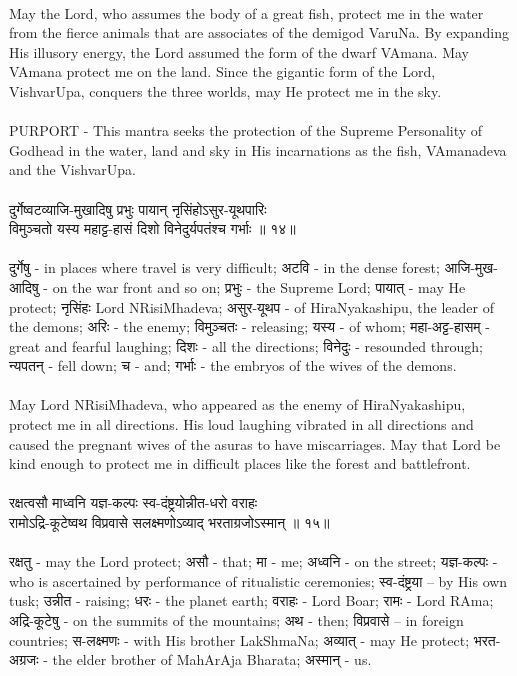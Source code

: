 \\
May the Lord, who assumes the body of a great fish, protect me in the water from the fierce animals that are associates of the demigod VaruNa. By expanding His illusory energy, the Lord assumed the form of the dwarf VAmana. May VAmana protect me on the land. Since the gigantic form of the Lord, VishvarUpa, conquers the three worlds, may He protect me in the sky.\\
\\
PURPORT - This mantra seeks the protection of the Supreme Personality of Godhead in the water, land and sky in His incarnations as the fish, VAmanadeva and the VishvarUpa.\\
\\
दुर्गेष्वटव्याजि-मुखादिषु प्रभुः पायान् नृसिंहोऽसुर-यूथपारिः\\
विमुञ्चतो यस्य महाट्ट-हासं दिशो विनेदुर्यपतंश्च गर्भाः ॥ १४॥\\
\\
दुर्गेषु - in places where travel is very difficult; अटवि - in the dense forest;  आजि-मुख-आदिषु - on the war front and so on;  प्रभुः - the Supreme Lord;  पायात् - may He protect;  नृसिंहः  Lord NRisiMhadeva;  असुर-यूथप - of HiraNyakashipu, the leader of the demons;  अरिः - the enemy; विमुञ्चतः - releasing;  यस्य - of whom;  महा-अट्ट-हासम् - great and fearful laughing;  दिशः - all the directions;  विनेदुः - resounded through;  न्यपतन् - fell down;  च - and;  गर्भाः - the embryos of the wives of the demons.\\
\\
May Lord NRisiMhadeva, who appeared as the enemy of HiraNyakashipu, protect me in all directions. His loud laughing vibrated in all directions and caused the pregnant wives of the asuras to have miscarriages. May that Lord be kind enough to protect me in difficult places like the forest and battlefront.\\
\\ 
रक्षत्वसौ माध्वनि यज्ञ-कल्पः स्व-दंष्ट्रयोन्नीत-धरो वराहः\\
रामोऽद्रि-कूटेष्वथ विप्रवासे सलक्ष्मणोऽव्याद् भरताग्रजोऽस्मान् ॥ १५॥\\
\\
रक्षतु - may the Lord protect;  असौ - that;  मा - me; अध्वनि - on the street;  यज्ञ-कल्पः - who is ascertained by performance of ritualistic ceremonies;  स्व-दंष्ट्रया – by His own tusk;  उन्नीत - raising;  धरः - the planet earth; वराहः - Lord Boar;  रामः - Lord RAma;  अद्रि-कूटेषु - on the summits of the mountains;  अथ - then;  विप्रवासे – in foreign countries;  स-लक्ष्मणः -  with His brother LakShmaNa; अव्यात् - may He protect;  भरत-अग्रजः - the elder brother of MahArAja Bharata;  अस्मान् - us.\\
